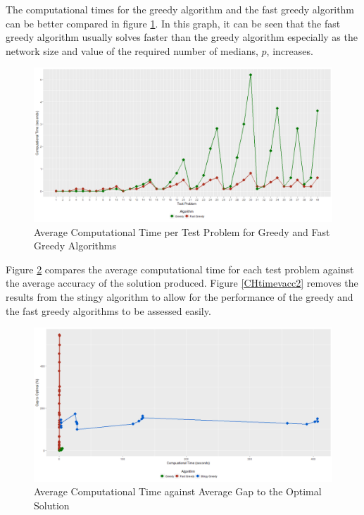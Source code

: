 \documentclass[11pt]{article}
\begin{document}
	The computational times for the greedy algorithm and the fast greedy algorithm can be better compared in figure \ref{CH.av.time2}.  In this graph, it can be seen that the fast greedy algorithm usually solves faster than the greedy algorithm especially as the network size and value of the required number of medians, $p$, increases.
	
	\begin{figure}[H]
		\begin{center}
			\includegraphics[width=14cm]{CHavtime2.png}
			\caption{Average Computational Time per Test Problem for Greedy and Fast Greedy Algorithms}
			\label{CH.av.time2}
		\end{center}
	\end{figure}
	
	Figure \ref{CHtimevacc1} compares the average computational time for each test problem against the average accuracy of the solution produced.  Figure \ref{CHtimevacc2} removes the results from the stingy algorithm to allow for the performance of the greedy and the fast greedy algorithms to be assessed easily.
	
	\begin{figure}[H]
		\begin{center}
			\includegraphics[width=14cm]{CHtimevacc1.png}
			\caption{Average Computational Time against Average Gap to the Optimal Solution}
			\label{CHtimevacc1}
		\end{center}
	\end{figure}
	
\end{document}
